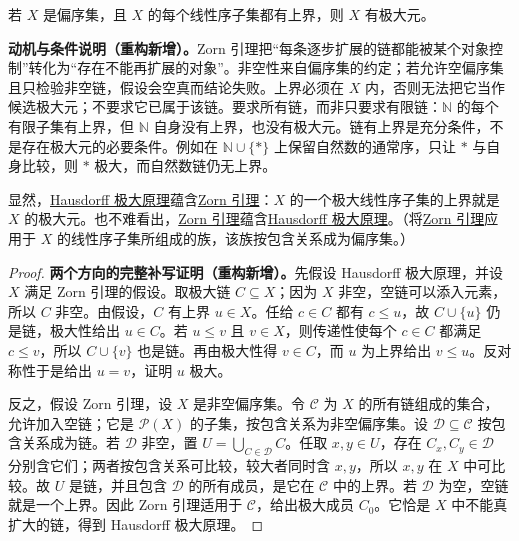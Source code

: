 \documentclass[../../main.tex]{subfiles}%
\begin{document}
\begin{lemma}[Zorn 引理]\label{lemma:ch00-zorn}
若 $X$ 是偏序集，且 $X$ 的每个线性序子集都有上界，则 $X$ 有极大元。
\end{lemma}
\begin{remark}
\textbf{动机与条件说明（重构新增）。}Zorn 引理把“每条逐步扩展的链都能被某个对象控制”转化为“存在不能再扩展的对象”。非空性来自偏序集的约定；若允许空偏序集且只检验非空链，假设会空真而结论失败。上界必须在 $X$ 内，否则无法把它当作候选极大元；不要求它已属于该链。要求所有链，而非只要求有限链：$\mathbb{N}$ 的每个有限子集有上界，但 $\mathbb{N}$ 自身没有上界，也没有极大元。链有上界是充分条件，不是存在极大元的必要条件。例如在 $\mathbb{N}\cup\{\ast\}$ 上保留自然数的通常序，只让 $\ast$ 与自身比较，则 $\ast$ 极大，而自然数链仍无上界。
\end{remark}


\begin{remark}
显然，\hyperref[principle:ch00-hausdorff-maximal]{Hausdorff 极大原理}蕴含\hyperref[lemma:ch00-zorn]{Zorn 引理}：$X$ 的一个极大线性序子集的上界就是 $X$ 的极大元。也不难看出，\hyperref[lemma:ch00-zorn]{Zorn 引理}蕴含\hyperref[principle:ch00-hausdorff-maximal]{Hausdorff 极大原理}。（将\hyperref[lemma:ch00-zorn]{Zorn 引理}应用于 $X$ 的线性序子集所组成的族，该族按包含关系成为偏序集。）
\end{remark}
\begin{proof}
\textbf{两个方向的完整补写证明（重构新增）。}先假设 Hausdorff 极大原理，并设 $X$ 满足 Zorn 引理的假设。取极大链 $C\subseteq X$；因为 $X$ 非空，空链可以添入元素，所以 $C$ 非空。由假设，$C$ 有上界 $u\in X$。任给 $c\in C$ 都有 $c\leqslant u$，故 $C\cup\{u\}$ 仍是链，极大性给出 $u\in C$。若 $u\leqslant v$ 且 $v\in X$，则传递性使每个 $c\in C$ 都满足 $c\leqslant v$，所以 $C\cup\{v\}$ 也是链。再由极大性得 $v\in C$，而 $u$ 为上界给出 $v\leqslant u$。反对称性于是给出 $u=v$，证明 $u$ 极大。

反之，假设 Zorn 引理，设 $X$ 是非空偏序集。令 $\mathscr{C}$ 为 $X$ 的所有链组成的集合，允许加入空链；它是 $\mathscr{P}(X)$ 的子集，按包含关系为非空偏序集。设 $\mathscr{D}\subseteq\mathscr{C}$ 按包含关系成为链。若 $\mathscr{D}$ 非空，置 $U=\bigcup_{C\in\mathscr{D}}C$。任取 $x,y\in U$，存在 $C_x,C_y\in\mathscr{D}$ 分别含它们；两者按包含关系可比较，较大者同时含 $x,y$，所以 $x,y$ 在 $X$ 中可比较。故 $U$ 是链，并且包含 $\mathscr{D}$ 的所有成员，是它在 $\mathscr{C}$ 中的上界。若 $\mathscr{D}$ 为空，空链就是一个上界。因此 Zorn 引理适用于 $\mathscr{C}$，给出极大成员 $C_0$。它恰是 $X$ 中不能真扩大的链，得到 Hausdorff 极大原理。
\end{proof}
\end{document}
